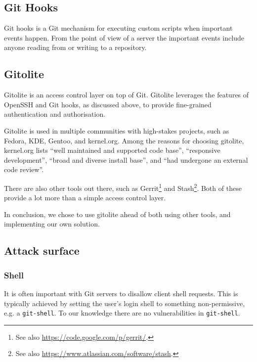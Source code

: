 \subsection{Git Hooks}

Git hooks is a Git mechanism for executing custom scripts when important events
happen. From the point of view of a server the important events include anyone
reading from or writing to a repository.

\subsection{Gitolite}

Gitolite is an access control layer on top of Git\cite{gitolite-com-2014a}.
Gitolite leverages the features of OpenSSH and Git hooks, as discussed above,
to provide fine-grained authentication and
authorisation\cite{gitolite-com-2014b}.

Gitolite is used in multiple communities with high-stakes projects, such as
Fedora, KDE, Gentoo, and kernel.org\cite{gitolite-com-2014c}. Among the reasons
for choosing gitolite, kernel.org lists\cite{kernel-org-2014} ``well maintained
and supported code base'', ``responsive development'', ``broad and diverse
install base'', and ``had undergone an external code
review''\cite{gitolite-google-group-2011}.

There are also other tools out there, such as  Gerrit\footnote{See also
\url{https://code.google.com/p/gerrit/}.} and Stash\footnote{See also
\url{https://www.atlassian.com/software/stash}.}. Both of these provide a lot
more than a simple access control layer.

In conclusion, we chose to use gitolite ahead of both using other tools, and
implementing our own solution.

\subsection{Attack surface}

\subsubsection{Shell}

It is often important with Git servers to disallow client shell requests.  This
is typically achieved by setting the user's login shell to something
non-permissive, e.g. a \texttt{git-shell}\cite{man-1-git-shell}. To our
knowledge there are no vulnerabilities in \texttt{git-shell}.

